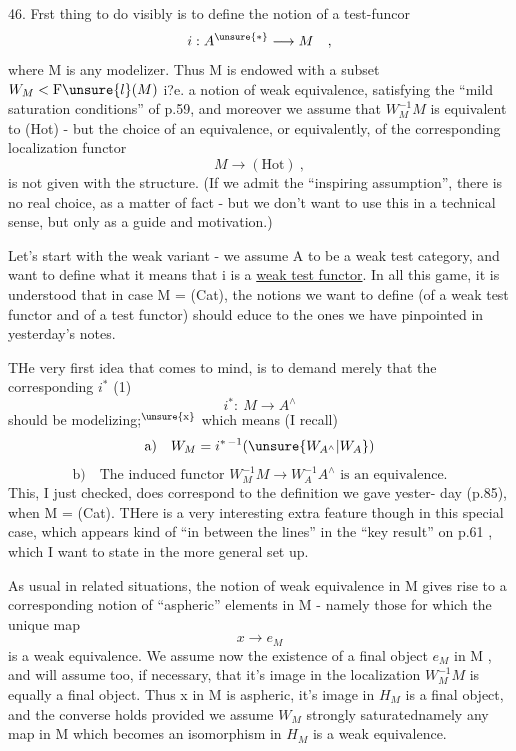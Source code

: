 46.   Frst thing to do visibly is to define  the notion of a test-funcor
\[ i : A^{\unsure{*}} \longrightarrow M \quad , \]
where M is any modelizer. Thus M is endowed with a  subset $W_M < \mathrm{F}\unsure{l}(M)$
 i?e. a notion of weak equivalence,  satisfying the ``mild saturation
conditions'' of p.59,  and moreover we assume that $W_M^{-1}M$  is equivalent to
(Hot)  -  but the choice of an equivalence,  or equivalently,  of the
corresponding localization functor
\[ M \longrightarrow (\mathrm{Hot}) \ , \]
is not given with the structure.  (If we admit the ``inspiring assumption'',
there is no real choice,  as a matter of fact  -  but we don't want to use
this in a technic\hand{\unsure{$\smile$}}al  sense,  but only as a guide and motivation.)

Let's start with the weak variant  -  we assume A to be a weak test
category,  and want to define what it means that i is a \uline{weak test functor}.
In all this game,  it is understood that in case M = (Cat),  the notions
we want to define (of a weak test functor and of a test functor) should
educe to the ones we have pinpointed in yesterday's notes.

THe very first idea that comes to mind,  is to demand merely that
the corresponding  $i^*$  (1)
\[ i^*:\ M \longrightarrow A^\wedge \]
should be  modelizing;$^{\unsure{\mathrm{x}}}$  which means (I recall)
\[ \text{a)}\quad W_M = i^{*\,-1}(\unsure{W_{A^\wedge}|W_A}) \]
\[ \text{b)}\quad \text{The induced functor } W_M^{-1}M \longrightarrow W_A^{-1}A^\wedge \text{ is an equivalence.} \]
This,  I just checked,  does correspond to the definition we gave yester-%
day (p.85),  when  M = (Cat).  THere is a very interesting extra feature
though in this special case,  which appears kind of ``in between the lines''
in the ``key result'' on p.61 ,  which I want  to state in the more general
set up.

As usual in related situations,  the notion of weak equivalence in
M  gives rise to a corresponding notion of ``aspheric'' elements in M -
namely those for which the unique map
\[ x \longrightarrow e_M \]
is a weak equivalence. We assume now the existence of a final object $e_M$
in M ,  and will assume too,  if necessary,  that it's image in the
localization $W_M^{-1}M$  is equally a final object.\hand{$*$}  Thus  x in M
is aspheric,  it's image in $H_M$  is a final object,  and the converse holds
provided we assume $W_M$  strongly saturated\hand{,}namely any map in M which becomes
an isomorphism in $H_M$  is a weak equivalence.

